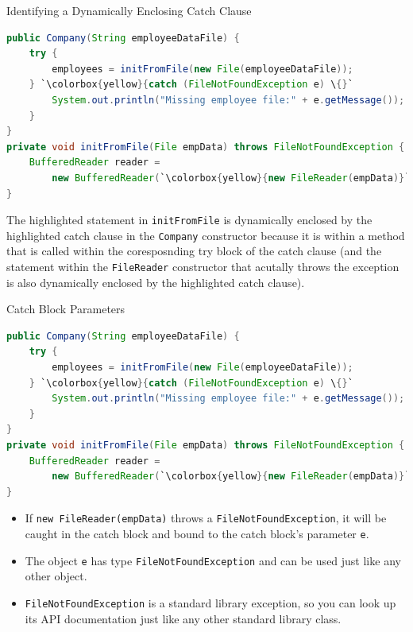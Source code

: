 \documentclass{beamer}
\begin{document}
\begin{frame}[fragile]{Identifying a Dynamically Enclosing Catch Clause}


\begin{lstlisting}[language=Java,escapechar=`]
public Company(String employeeDataFile) {
    try {
        employees = initFromFile(new File(employeeDataFile));
    } `\colorbox{yellow}{catch (FileNotFoundException e) \{}`
        System.out.println("Missing employee file:" + e.getMessage());
    }
}
private void initFromFile(File empData) throws FileNotFoundException {
    BufferedReader reader =
        new BufferedReader(`\colorbox{yellow}{new FileReader(empData)}`);
}
\end{lstlisting}

The highlighted statement in {\tt initFromFile} is dynamically enclosed by the highlighted catch clause in the {\tt Company} constructor because it is within a method that is called within the coresposnding try block of the catch clause (and the statement within the {\tt FileReader} constructor that acutally throws the exception is also dynamically enclosed by the highlighted catch clause).



\end{frame}

\begin{frame}[fragile]{Catch Block Parameters}
\vspace{-.1in}
\begin{lstlisting}[language=Java,escapechar=`]
public Company(String employeeDataFile) {
    try {
        employees = initFromFile(new File(employeeDataFile));
    } `\colorbox{yellow}{catch (FileNotFoundException e) \{}`
        System.out.println("Missing employee file:" + e.getMessage());
    }
}
private void initFromFile(File empData) throws FileNotFoundException {
    BufferedReader reader =
        new BufferedReader(`\colorbox{yellow}{new FileReader(empData)}`);
}
\end{lstlisting}
\vspace{-.1in}
\begin{itemize}
\item If {\tt new FileReader(empData)} throws a {\tt FileNotFoundException}, it will be caught in the catch block and bound to the catch block's parameter {\tt e}.
\item The object {\tt e} has type {\tt FileNotFoundException} and can be used just like any other object.
\item {\tt FileNotFoundException} is a standard library exception, so you can look up its API documentation just like any other standard library class.
\end{itemize}

\end{frame}
\end{document}
